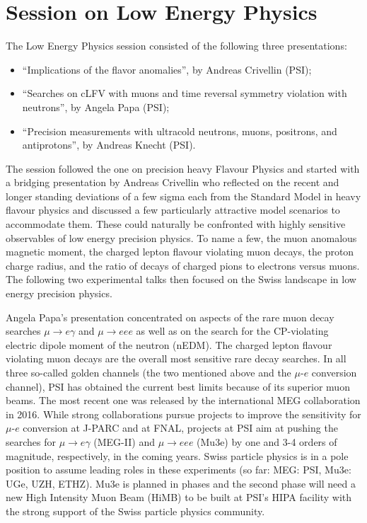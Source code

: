 \section{Session on Low Energy Physics}\label{lowenergy}


The Low Energy Physics session consisted of the following three  presentations:
\begin{itemize} \setlength{\itemsep}{-1ex}
\item ``Implications of the flavor anomalies'', by  Andreas Crivellin (PSI);
\item ``Searches on cLFV with muons and time reversal symmetry violation with
neutrons'', by Angela Papa (PSI);
\item ``Precision measurements with ultracold
neutrons, muons, positrons, and antiprotons'', by Andreas Knecht (PSI).
\end{itemize}

The session followed the one on precision heavy Flavour Physics and
started with a bridging presentation by Andreas Crivellin who
reflected on the recent and longer standing deviations of a few sigma
each from the Standard Model in heavy flavour physics and discussed a
few particularly attractive model scenarios to accommodate them. These
could naturally be confronted with highly sensitive observables of low
energy precision physics. To name a few, the muon anomalous magnetic
moment, the charged lepton flavour violating muon decays, the proton
charge radius, and the ratio of decays of charged pions to electrons
versus muons. The following two experimental talks then focused on the
Swiss landscape in low energy precision physics.

Angela Papa's presentation concentrated on aspects of the rare muon
decay searches $\mu\to e \gamma$ and $\mu\to eee$ as well as on the
search for the CP-violating electric dipole moment of the neutron
(nEDM).  The charged lepton flavour violating muon decays are the
overall most sensitive rare decay searches. 
In all three so-called golden channels (the two
mentioned above and the $\mu$-$e$ conversion channel), 
PSI has obtained the current best limits because of its superior muon beams. 
The most recent one was released by the international MEG
collaboration in 2016. While strong collaborations pursue projects to
improve the sensitivity for $\mu$-$e$ conversion at J-PARC and at
FNAL, projects at PSI aim at pushing the searches for $\mu\to e
\gamma$ (MEG-II) and $\mu\to eee$ (Mu3e) by one and 3-4 orders of
magnitude, respectively, in the coming years. Swiss particle physics is
in a pole position to assume leading roles in these experiments (so
far: MEG: PSI, Mu3e: UGe, UZH, ETHZ). Mu3e is planned in phases
and the second phase will need a new High Intensity Muon Beam (HiMB)
to be built at PSI's HIPA facility with the strong support of the Swiss
particle physics community.

